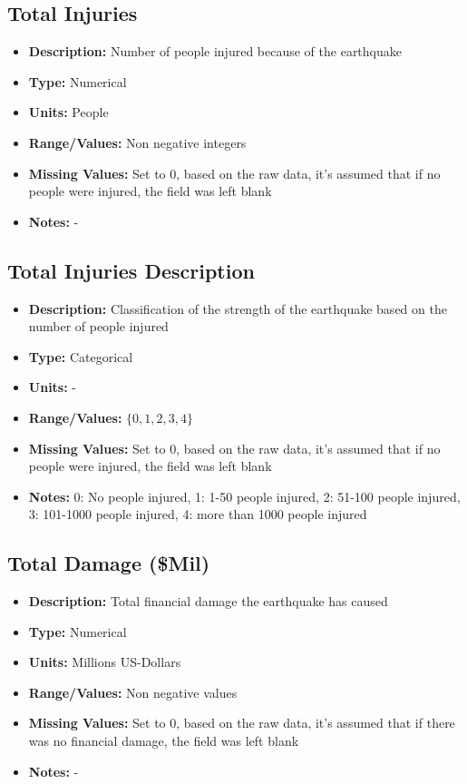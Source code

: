 \documentclass{article}
\begin{document}
\subsection{Total Injuries}
\begin{itemize}
    \item \textbf{Description:} Number of people injured because of the earthquake
    \item \textbf{Type:} Numerical
    \item \textbf{Units:} People
    \item \textbf{Range/Values:} Non negative integers
    \item \textbf{Missing Values:} Set to 0, based on the raw data, it's assumed that if no people were injured, the field was left blank
    \item \textbf{Notes:} -
\end{itemize}

\subsection{Total Injuries Description}
\begin{itemize}
    \item \textbf{Description:} Classification of the strength of the earthquake based on the number of people injured
    \item \textbf{Type:} Categorical
    \item \textbf{Units:} -
    \item \textbf{Range/Values:} $\{0,1,2,3,4 \}$
    \item \textbf{Missing Values:} Set to 0, based on the raw data, it's assumed that if no people were injured, the field was left blank
    \item \textbf{Notes:} 0: No people injured, 1: 1-50 people injured, 2: 51-100 people injured, 3: 101-1000 people injured, 4: more than 1000 people injured
\end{itemize}

\subsection{Total Damage (\$Mil)}
\begin{itemize}
    \item \textbf{Description:} Total financial damage the earthquake has caused
    \item \textbf{Type:} Numerical
    \item \textbf{Units:} Millions US-Dollars
    \item \textbf{Range/Values:} Non negative values 
    \item \textbf{Missing Values:} Set to 0, based on the raw data, it's assumed that if there was no financial damage, the field was left blank
    \item \textbf{Notes:} -
\end{itemize}
\end{document}
